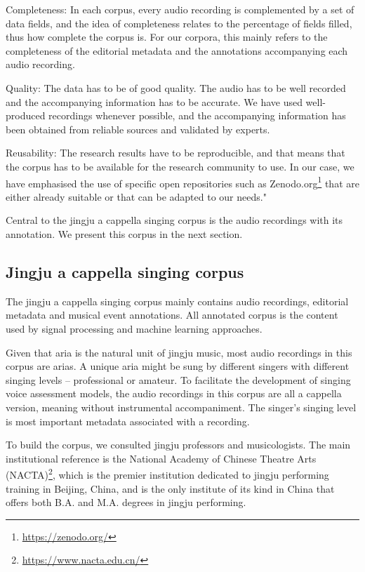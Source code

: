 Completeness: In each corpus, every audio recording is complemented by a set of data fields, and the idea of completeness relates to the percentage of fields filled, thus how complete the corpus is. For our corpora, this mainly refers to the completeness of the editorial metadata and the annotations accompanying each audio recording.

Quality: The data has to be of good quality. The audio has to be well recorded and the accompanying information has to be accurate. We have used well-produced recordings whenever possible, and the accompanying information has been obtained from reliable sources and validated by experts.

Reusability: The research results have to be reproducible, and that means that the corpus has to be available for the research community to use. In our case, we have emphasised the use of specific open repositories such as Zenodo.org\footnote{\url{https://zenodo.org/}} that are either already suitable or that can be adapted to our needs."

Central to the jingju a cappella singing corpus is the audio recordings with its annotation. We present this corpus in the next section.

\subsection{Jingju a cappella singing corpus}\label{sec:ch4:jingju_acappella_singing_corpus}

The jingju a cappella singing corpus mainly contains audio recordings, editorial metadata and musical event annotations. All annotated corpus is the content used by signal processing and machine learning approaches.

Given that aria is the natural unit of jingju music, most audio recordings in this corpus are arias. A unique aria might be sung by different singers with different singing levels -- professional or amateur. To facilitate the development of singing voice assessment models, the audio recordings in this corpus are all a cappella version, meaning without instrumental accompaniment. The singer's singing level is most important metadata associated with a recording.

To build the corpus, we consulted jingju professors and musicologists. The main institutional reference is the National Academy of Chinese Theatre Arts (NACTA)\footnote{\url{https://www.nacta.edu.cn/}}, which is the premier institution dedicated to jingju performing training in Beijing, China, and is the only institute of its kind in China that offers both B.A. and M.A. degrees in jingju performing.


